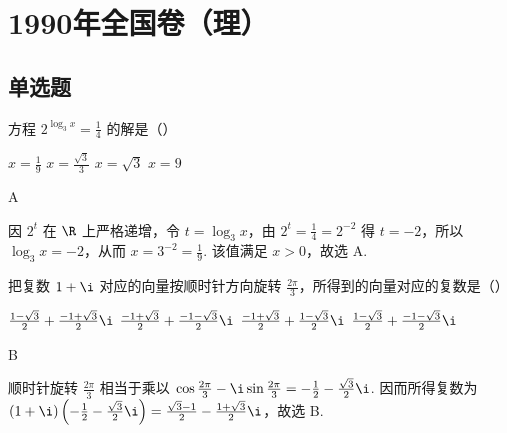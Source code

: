 
\chapter{1990年全国卷（理）}
\section{单选题}

\begin{problem}
方程 \(2^{\log_3 x}=\frac{1}{4}\) 的解是（\quad）

\choices
    {\(x=\frac{1}{9}\)}
    {\(x=\frac{\sqrt{3}}{3}\)}
    {\(x=\sqrt{3}\)}
    {\(x=9\)}

\begin{answer}
A
\end{answer}

\begin{solution}
因 \(2^t\) 在 \(\R\) 上严格递增，令 \(t=\log_3 x\)，由 \(2^t=\frac{1}{4}=2^{-2}\) 得 \(t=-2\)，所以 \(\log_3 x=-2\)，从而 \(x=3^{-2}=\frac{1}{9}\). 该值满足 \(x>0\)，故选 A.
\end{solution}
\end{problem}

\begin{problem}
把复数 \(1+\i\) 对应的向量按顺时针方向旋转 \(\frac{2\pi}{3}\)，所得到的向量对应的复数是（\quad）

\choices
    {\(\frac{1-\sqrt{3}}{2}+\frac{-1+\sqrt{3}}{2}\i\)}
    {\(\frac{-1+\sqrt{3}}{2}+\frac{-1-\sqrt{3}}{2}\i\)}
    {\(\frac{-1+\sqrt{3}}{2}+\frac{1-\sqrt{3}}{2}\i\)}
    {\(\frac{1-\sqrt{3}}{2}+\frac{-1-\sqrt{3}}{2}\i\)}

\begin{answer}
B
\end{answer}

\begin{solution}
顺时针旋转 \(\frac{2\pi}{3}\) 相当于乘以 \(\cos\frac{2\pi}{3}-\i\sin\frac{2\pi}{3}=-\frac{1}{2}-\frac{\sqrt{3}}{2}\i\). 因而所得复数为 \((1+\i)\left(-\frac{1}{2}-\frac{\sqrt{3}}{2}\i\right)=\frac{\sqrt{3}-1}{2}-\frac{1+\sqrt{3}}{2}\i\)，故选 B.
\end{solution}
\end{problem}

